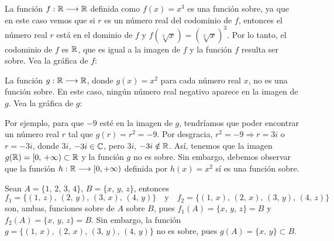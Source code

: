 \begin{myexample}
    La función $f: \RR \longrightarrow \RR$ definida como $f(x) = x^3$ es una función sobre, ya que en este caso vemos que si $r$ es un número real del codominio de $f$, entonces el número real $r$ está en el dominio de $f$ y $f\left(\sqrt[3]{x}\right) = \left( \sqrt[3]{x}\right)^3$. Por lo tanto, el codominio de $f$ es $\RR$, que es igual a la imagen de $f$ y la función $f$ resulta ser sobre. Vea la gráfica de $f$:
    \begin{center}
    \end{center}
    La función $g: \RR \longrightarrow \RR$, donde $g(x) = x^2$ para cada número real $x$, no es una función sobre. En este caso, ningún número real negativo aparece en la imagen de $g$. Vea la gráfica de $g$:
    \begin{center}
    \end{center}
    Por ejemplo, para que $-9$ esté en la imagen de $g$, tendríamos que poder encontrar un número real $r$ tal que $g(r) = r^2 = - 9$. Por desgracia, $r^2 = - 9 \Longrightarrow r= 3i$ o $r=- 3i$, donde $3i$, $-3i \in \CC$, pero $3i$, $-3i \notin \RR$. Así, tenemos que la imagen $g(\RR) = [0, \, + \infty) \subset \RR$ y la función $g$ no es sobre. Sin embargo, debemos observar que la función $h: \RR \longrightarrow [0, + \infty)$ definida por $h(x) = x^2$ sí es una función sobre.
\end{myexample}

\newpage

\begin{myexample}
    Sean $A = \{ 1, \, 2, \, 3, \, 4 \}$, $B = \{ x, \, y, \, z \}$, entonces
    $$f_1 = \{ (1, \, z), \, (2, \, y), \, (3, \, x), \, (4, \, y) \} \quad \text{y} \quad f_2 = \{ (1, \, x), \, (2, \, x), \, (3, \, y), \, (4, \, z) \}$$
    son, ambas, funciones sobre de $A$ sobre $B$, pues $f_1(A) = \{ x, \, y, \, z \} = B$ y $f_2(A) = \{ x, \, y, \, z \} = B$. Sin embargo, la función $g = \{ (1, \, x), \, (2, \, x), \, (3, \, y), \, (4, \, y) \}$ no es sobre, pues $g(A) = \{x, \, y \} \subset B$.
\end{myexample}

